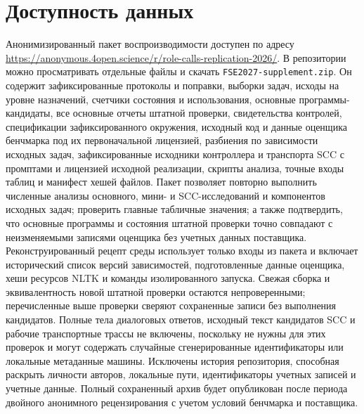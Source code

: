\section*{Доступность данных}
Анонимизированный пакет воспроизводимости доступен по адресу \url{https://anonymous.4open.science/r/role-calls-replication-2026/}. В репозитории можно просматривать отдельные файлы и скачать \texttt{FSE2027-supplement.zip}. Он содержит зафиксированные протоколы и поправки, выборки задач, исходы на уровне назначений, счетчики состояния и использования, основные программы-кандидаты, все основные отчеты штатной проверки, свидетельства контролей, спецификации зафиксированного окружения, исходный код и данные оценщика бенчмарка под их первоначальной лицензией, разбиения по зависимости исходных задач, зафиксированные исходники контроллера и транспорта SCC с промптами и лицензией исходной реализации, скрипты анализа, точные входы таблиц и манифест хешей файлов. Пакет позволяет повторно выполнить численные анализы основного, мини- и SCC-исследований и компонентов исходных задач; проверить главные табличные значения; а также подтвердить, что основные программы и состояния штатной проверки точно совпадают с неизменяемыми записями оценщика без учетных данных поставщика. Реконструированный рецепт среды использует только входы из пакета и включает исторический список версий зависимостей, подготовленные данные оценщика, хеши ресурсов NLTK и команды изолированного запуска. Свежая сборка и эквивалентность новой штатной проверки остаются непроверенными; перечисленные выше проверки сверяют сохраненные записи без выполнения кандидатов. Полные тела диалоговых ответов, исходный текст кандидатов SCC и рабочие транспортные трассы не включены, поскольку не нужны для этих проверок и могут содержать случайные сгенерированные идентификаторы или локальные метаданные машины. Исключены история репозитория, способная раскрыть личности авторов, локальные пути, идентификаторы учетных записей и учетные данные. Полный сохраненный архив будет опубликован после периода двойного анонимного рецензирования с учетом условий бенчмарка и поставщика.
